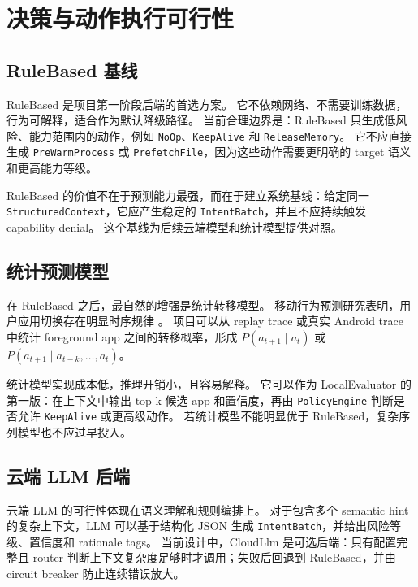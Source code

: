 \documentclass[12pt,a4paper]{article}
\begin{document}
\section{决策与动作执行可行性}\label{sec:decision-action}

\subsection{RuleBased 基线}\label{subsec:rulebased}

RuleBased 是项目第一阶段后端的首选方案。
它不依赖网络、不需要训练数据，行为可解释，适合作为默认降级路径。
当前合理边界是：RuleBased 只生成低风险、能力范围内的动作，例如 \texttt{NoOp}、\texttt{KeepAlive} 和 \texttt{ReleaseMemory}。
它不应直接生成 \texttt{PreWarmProcess} 或 \texttt{PrefetchFile}，因为这些动作需要更明确的 target 语义和更高能力等级。

RuleBased 的价值不在于预测能力最强，而在于建立系统基线：给定同一 \texttt{StructuredContext}，它应产生稳定的 \texttt{IntentBatch}，并且不应持续触发 capability denial。
这个基线为后续云端模型和统计模型提供对照。

\subsection{统计预测模型}\label{subsec:statistical}

在 RuleBased 之后，最自然的增强是统计转移模型。
移动行为预测研究表明，用户应用切换存在明显时序规律 \cite{falcon,appusage2vec,deepapp,li2022smartphone}。
项目可以从 replay trace 或真实 Android trace 中统计 foreground app 之间的转移概率，形成
$P(a_{t+1} \mid a_t)$ 或 $P(a_{t+1} \mid a_{t-k}, \ldots, a_t)$。

统计模型实现成本低，推理开销小，且容易解释。
它可以作为 LocalEvaluator 的第一版：在上下文中输出 top-k 候选 app 和置信度，再由 \texttt{PolicyEngine} 判断是否允许 \texttt{KeepAlive} 或更高级动作。
若统计模型不能明显优于 RuleBased，复杂序列模型也不应过早投入。

\subsection{云端 LLM 后端}\label{subsec:cloudllm}

云端 LLM 的可行性体现在语义理解和规则编排上。
对于包含多个 semantic hint 的复杂上下文，LLM 可以基于结构化 JSON 生成 \texttt{IntentBatch}，并给出风险等级、置信度和 rationale tags。
当前设计中，CloudLlm 是可选后端：只有配置完整且 router 判断上下文复杂度足够时才调用；失败后回退到 RuleBased，并由 circuit breaker 防止连续错误放大。
\end{document}
